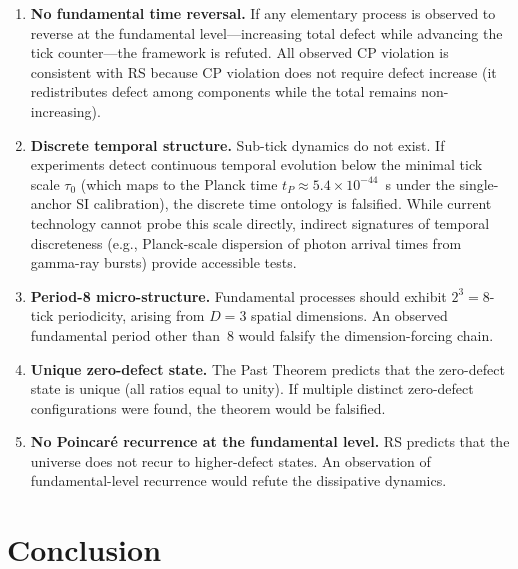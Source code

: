 \documentclass[12pt,a4paper]{article}
\theoremstyle{definition}
\theoremstyle{remark}
\begin{document}
\begin{enumerate}
  \item \textbf{No fundamental time reversal.}  If any elementary
  process is observed to reverse at the fundamental level---increasing
  total defect while advancing the tick counter---the framework is
  refuted.  All observed CP violation is consistent with RS because CP
  violation does not require defect increase (it redistributes defect
  among components while the total remains non-increasing).

  \item \textbf{Discrete temporal structure.}  Sub-tick dynamics do not
  exist.  If experiments detect continuous temporal evolution below the
  minimal tick scale $\tau_0$ (which maps to the Planck time
  $t_P \approx 5.4 \times 10^{-44}$~s under the single-anchor SI
  calibration), the discrete time ontology is falsified.  While current
  technology cannot probe this scale directly, indirect signatures of
  temporal discreteness (e.g., Planck-scale dispersion of photon arrival
  times from gamma-ray bursts) provide accessible tests.

  \item \textbf{Period-8 micro-structure.}  Fundamental processes should
  exhibit $2^3 = 8$-tick periodicity, arising from $D = 3$ spatial
  dimensions.  An observed fundamental period other than~8 would falsify
  the dimension-forcing chain.

  \item \textbf{Unique zero-defect state.}  The Past Theorem predicts
  that the zero-defect state is unique (all ratios equal to unity).  If
  multiple distinct zero-defect configurations were found, the theorem
  would be falsified.

  \item \textbf{No Poincar\'e recurrence at the fundamental level.}  RS
  predicts that the universe does not recur to higher-defect states.  An
  observation of fundamental-level recurrence would refute the
  dissipative dynamics.
\end{enumerate}

\section{Conclusion}
\label{sec:conclusion}
\end{document}
